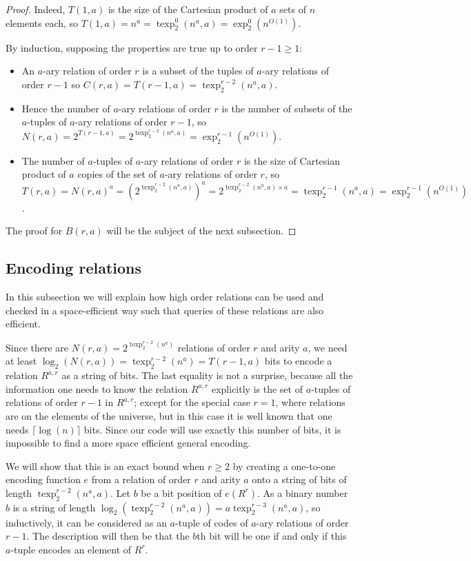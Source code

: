\documentclass[a4paper,12pt]{article}
\theoremstyle{definition}
\DeclareMathOperator{\texp}{texp}
\begin{document}
\begin{proof}Indeed, $T(1,a)$ is the size of the Cartesian product of $a$ sets
  of $n$ elements each, so
  $T(1,a)=n^a=\texp^{0}_2(n^a,a)=\exp_2^{0}(n^{O(1)})$.

  By induction, supposing the properties are true up to order
  $r-1\ge1$:
  \begin{itemize}
  \item{}An $a$-ary relation of order $r$ is a subset of the tuples of
    $a$-ary relations of order $r-1$ so
    $C(r,a)=T(r-1,a)=\texp^{r-2}_2(n^a,a)$.
  \item{}Hence the number of $a$-ary relations of order $r$ is the
    number of subsets of the $a$-tuples of $a$-ary relations of order
    $r-1$, so
    $N(r,a)=2^{T(r-1,a)}=2^{\texp^{r-2}_2(n^a,a)}=\exp^{r-1}_2(n^{O(1)})$.
  \item The number of $a$-tuples of $a$-ary relations of order $r$ is
    the size of Cartesian product of $a$ copies of the set of $a$-ary
    relations of order $r$, so
    $T(r,a)=N(r,a)^a=(2^{\texp^{r-2}_2(n^a,a)})^a=2^{\texp^{r-2}_2(n^a,a)\times
      a}=\texp^{r-1}_2(n^a,a)=\exp^{r-1}_2(n^{O(1)})$.
\end{itemize}
The proof for $B(r,a)$ will be the subject of the next subsection.
\end{proof}
\subsection{Encoding relations}\label{code}
In this subsection we will explain how high order relations can be
used and checked in a space-efficient way such that queries of these
relations are also efficient.

Since there are $N(r,a)=2^{{\texp}^{r-2}_2(n^a)}$ relations of order $r$
and arity $a$, we need at least
$\log_2(N(r,a))=\texp^{r-2}_2(n^a)=T(r-1,a)$ bits to encode a relation
$R^{a,r}$ as a string of bits. The last equality is not a surprise,
because all the information one needs to know the relation $R^{a,r}$
explicitly is the set of $a$-tuples of relations of order $r-1$ in
$R^{a,r}$; except for the special case $r=1$, where relations are on
the elements of the universe, but in this case it is well known that
one needs $\lceil\log(n)\rceil$ bits. Since our code will use exactly
this number of bits, it is impossible to find a more space efficient
general encoding.

We will show that this is an exact bound when $r\ge 2$ by creating a
one-to-one encoding function $e$ from a relation of order $r$ and
arity $a$ onto a string of bits of length $\texp^{r-2}_2(n^a,a)$. Let
$b$ be a bit position of $e(R^r)$. As a binary number $b$ is a string
of length $\log_2(\texp^{r-2}_2(n^a,a))=a\texp^{r-3}_2(n^a,a)$, so
inductively, it can be considered as an $a$-tuple of codes of $a$-ary
relations of order $r-1$. The description will then be that the $b$th
bit will be one if and only if this $a$-tuple encodes an element of
$R^r$.
\end{document}
